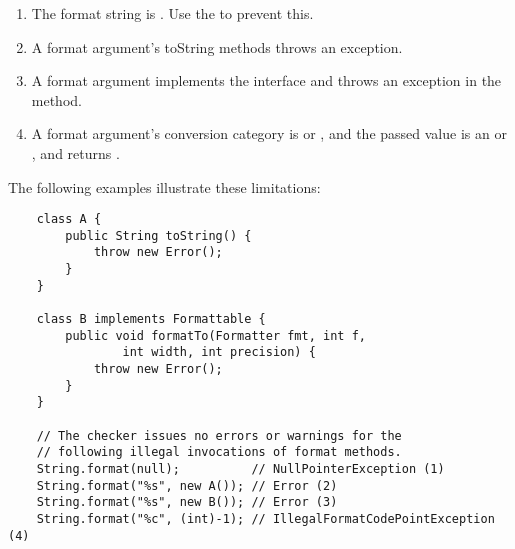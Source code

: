 \begin{enumerate}
\item The format string is . Use the  to prevent this.
\item A format argument's toString methods throws an exception.
\item A format argument implements the  interface and throws an
    exception in the  method.
\item A format argument's conversion category is  or ,
    and the passed value is an  or , and 
     returns .
\end{enumerate}

\noindent The following examples illustrate these limitations:

\begin{Verbatim}
    class A {
        public String toString() {
            throw new Error();
        }
    }

    class B implements Formattable {
        public void formatTo(Formatter fmt, int f, 
                int width, int precision) {
            throw new Error();
        }
    }

    // The checker issues no errors or warnings for the
    // following illegal invocations of format methods.
    String.format(null);          // NullPointerException (1)
    String.format("%s", new A()); // Error (2)
    String.format("%s", new B()); // Error (3)
    String.format("%c", (int)-1); // IllegalFormatCodePointException (4)
\end{Verbatim}

% 
% 


